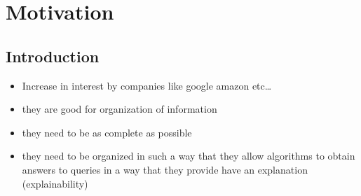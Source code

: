 \chapter{Motivation}\label{chap:motivation}




\section{Introduction}\label{sec:moti-intro}
\begin{itemize}
    \item Increase in interest by companies like google amazon etc\dots
    \item they are good for organization of information
    \item they need to be as complete as possible
    \item they need to be organized in such a way that they allow algorithms to obtain answers to queries in a way that they provide have an explanation (explainability)
\end{itemize}

